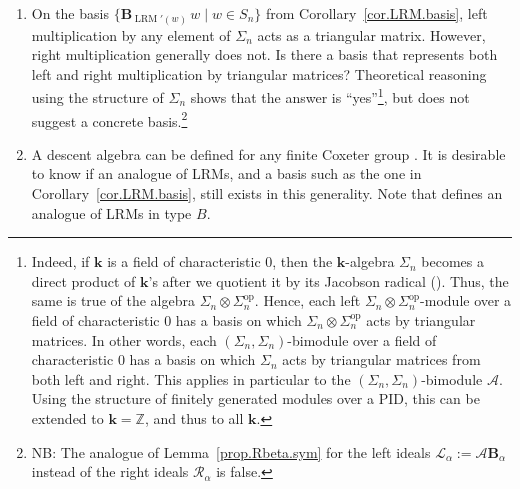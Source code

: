 \documentclass[submission]{FPSAC2026}
\newcommand{\ZZ}{\mathbb{Z}} %
\newcommand{\kk}{\mathbf{k}} %
\newcommand{\BB}{\mathbf{B}} %
\begin{document}
\begin{enumerate}

\item[\textbf{1.}]
On the basis $\bigl\{
\mathbf{B}_{\operatorname{LRM}'(w)}\, w
\;\big|\; w\in S_n \bigr\}$
from Corollary~\ref{cor.LRM.basis}, left multiplication
by any element of $\Sigma_n$ acts as a triangular matrix.
However, right multiplication generally does not.
Is there a basis that represents both left and right
multiplication by triangular matrices?
Theoretical reasoning using the structure of $\Sigma_n$
shows that the answer is ``yes''\footnote{Indeed, if
$\kk$ is a field of characteristic $0$, then the
$\kk$-algebra $\Sigma_n$ becomes a direct product of
$\kk$'s after we quotient it by its Jacobson radical
(\cite[\S 5.2]{Sch05}).
Thus, the same is true of the algebra
$\Sigma_n \otimes \Sigma_n^{\operatorname{op}}$.
Hence, each
left $\Sigma_n \otimes \Sigma_n^{\operatorname{op}}$-module
over a field of characteristic $0$ has a basis on which
$\Sigma_n \otimes \Sigma_n^{\operatorname{op}}$ acts by
triangular matrices.
In other words, each
\((\Sigma_n,\Sigma_n)\)-bimodule
over a field of characteristic $0$ has a basis on which
\(\Sigma_n\) acts by triangular matrices from both left
and right.
This applies in particular to the
\((\Sigma_n,\Sigma_n)\)-bimodule \(\mathcal{A}\).
Using the structure of finitely generated modules over
a PID, this can be
extended to $\kk = \ZZ$, and thus to all $\kk$.}, but does not
suggest a concrete basis.\footnote{NB: The
analogue of Lemma~\ref{prop.Rbeta.sym} for the left
ideals $\mathcal{L}_\alpha := \mathcal{A} \BB_\alpha$
instead of the right ideals $\mathcal{R}_\alpha$ is false.}

\item[\textbf{2.}]
A descent algebra can be defined for any finite Coxeter group \cite{Sol76}.
It is desirable to know if an analogue of LRMs, and a basis such
as the one in Corollary~\ref{cor.LRM.basis}, still exists in this generality.
Note that \cite[\S 3]{ChenGongGuo13} defines an analogue of LRMs in type $B$.

\end{enumerate}




\end{document}
